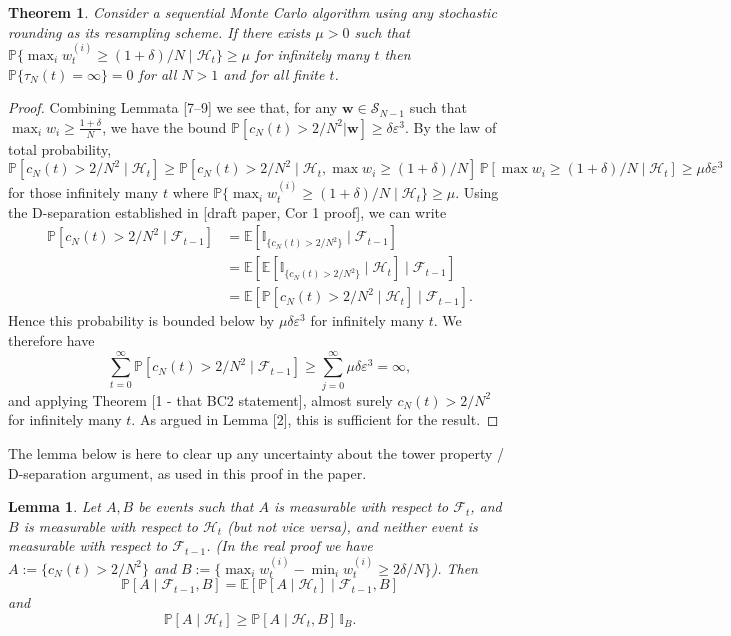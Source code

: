 \documentclass{article}
\newtheorem{thm}{Theorem}
\newtheorem{lemma}{Lemma}
\newcommand{\Prob}{\mathbb{P}}
\newcommand{\E}{\mathbb{E}}
\newcommand{\I}[1]{\mathbb{I}_{\{#1\}}}
\newcommand{\1}[1]{\mathbb{I}_{#1}}
\begin{document}
\begin{thm}
Consider a sequential Monte Carlo algorithm using any stochastic rounding as its resampling scheme.
If there exists $\mu>0$ such that $\Prob\{\max_i w_t^{(i)} \geq (1+\delta)/N \mid \mathcal{H}_t\} \geq \mu$ for infinitely many $t$ then $\Prob\{\tau_N(t) = \infty \}=0$ for all $N>1$ and for all finite $t$.
\end{thm}

\begin{proof}
Combining Lemmata [7--9] we see that, for any $\mathbf{w} \in \mathcal{S}_{N-1}$ such that $\max_i w_i \geq \frac{1 + \delta}{N}$, we have the bound $\Prob[ c_N(t) > 2/N^2 | \mathbf{w} ] \geq \delta\varepsilon^3$.
By the law of total probability,
\begin{equation*}
\Prob[c_N(t) > 2/N^2 \mid \mathcal{H}_t] 
\geq \Prob[c_N(t) > 2/N^2 \mid \mathcal{H}_t, \max w_i \geq (1+\delta)/N ]\, \Prob[\max w_i \geq (1+\delta)/N \mid \mathcal{H}_t]
\geq \mu \delta \varepsilon^3 
\end{equation*}
for those infinitely many $t$ where $\Prob\{\max_i w_t^{(i)} \geq (1+\delta)/N \mid \mathcal{H}_t\} \geq \mu$.
Using the D-separation established in [draft paper, Cor 1 proof], we can write
\begin{align*}
\Prob[c_N(t) > 2/N^2 \mid \mathcal{F}_{t-1}] 
&= \E[ \I{c_N(t) > 2/N^2} \mid \mathcal{F}_{t-1}] \\
&= \E[ \E[ \I{c_N(t) > 2/N^2} \mid \mathcal{H}_t ]\mid \mathcal{F}_{t-1}] \\
&= \E[ \Prob[c_N(t) > 2/N^2 \mid \mathcal{H}_t ]\mid \mathcal{F}_{t-1}] .
\end{align*}
Hence this probability is bounded below by $\mu\delta\varepsilon^3$ for infinitely many $t$. We therefore have
\begin{equation}
\sum_{t=0}^\infty \Prob[c_N(t) > 2/N^2 \mid \mathcal{F}_{t-1}]  \geq \sum_{j=0}^\infty \mu\delta\varepsilon^3 = \infty ,
\end{equation}
and applying Theorem [1 - that BC2 statement], almost surely $c_N(t) >2/N^2$ for infinitely many $t$.
As argued in Lemma [2], this is sufficient for the result.
\end{proof}

The lemma below is here to clear up any uncertainty about the tower property / D-separation argument, as used in this proof in the paper.
\begin{lemma}
Let $A,B$ be events such that $A$ is measurable with respect to $\mathcal{F}_{t}$, and $B$ is measurable with respect to $\mathcal{H}_{t}$ (but not vice versa), and neither event is measurable with respect to $\mathcal{F}_{t-1}$. 
(In the real proof we have $A:= \{c_N(t)>2/N^2\}$ and $B:= \{ \max_i w_t^{(i)} - \min_i w_t^{(i)} \geq 2\delta/N \}$).
Then
\begin{equation}
\Prob[A \mid \mathcal{F}_{t-1}, B] 
=\E[ \Prob[ A \mid \mathcal{H}_t] \mid \mathcal{F}_{t-1}, B ] 
\end{equation}
and
\begin{equation}
\Prob[A \mid \mathcal{H}_t] 
\geq \Prob[ A \mid \mathcal{H}_t, B] \, \1{B}.
\end{equation}
\end{lemma}
\end{document}
